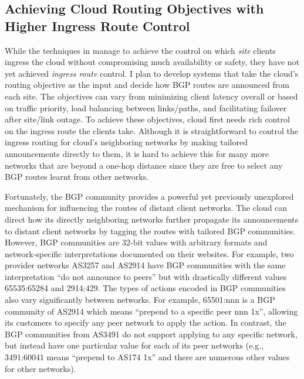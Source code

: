 \documentclass[sigconf,nonacm,screen,letterpaper,9pt]{acmart}
\begin{document}
\hypertarget{achieving-cloud-routing-objectives-with-higher-ingress-route-control}{%
\subsection{Achieving Cloud Routing Objectives with Higher Ingress Route
Control}\label{achieving-cloud-routing-objectives-with-higher-ingress-route-control}}

\label{sec:community}

While the techniques in  manage to achieve the control
on which \emph{site} clients ingress the cloud without compromising much
availability or safety, they have not yet achieved \emph{ingress route}
control. I plan to develop systems that take the cloud's routing
objective as the input and decide how BGP routes are announced from each
site. The objectives can vary from minimizing client latency overall or
based on traffic priority, load balancing between links/paths, and
facilitating failover after site/link outage. To achieve these
objectives, cloud first needs rich control on the ingress route the
clients take. Although it is straightforward to control the ingress
routing for cloud's neighboring networks by making tailored
announcements directly to them, it is hard to achieve this for many more
networks that are beyond a one-hop distance since they are free to
select any BGP routes learnt from other networks.

Fortunately, the BGP community provides a powerful yet previously
unexplored mechanism for influencing the routes of distant client
networks. The cloud can direct how its directly neighboring networks
further propagate its announcements to distant client networks by
tagging the routes with tailored BGP communities. However, BGP
communities are 32-bit values with arbitrary formats and
network-specific interpretations documented on their websites. For
example, two provider networks AS3257 and AS2914 have BGP communities
with the same interpretation ``do not announce to peers'' but with
drastically different values 65535:65284 and 2914:429. The types of
actions encoded in BGP communities also vary significantly between
networks. For example, 65501:nnn is a BGP community of AS2914 which
means ``prepend to a specific peer nnn 1x'', allowing its customers to
specify any peer network to apply the action. In contrast, the BGP
communities from AS3491 do not support applying to any specific network,
but instead have one particular value for each of its peer networks
(e.g., 3491:60041 means ``prepend to AS174 1x'' and there are numerous
other values for other networks).
\end{document}
